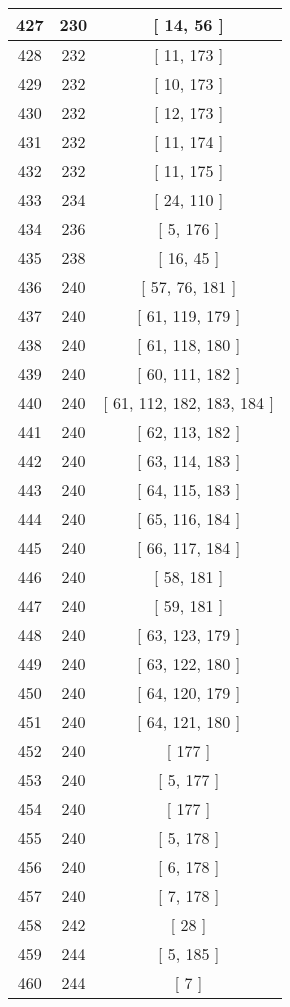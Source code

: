 \begin{center}
\begin{longtable}[H]{|| c c c ||}
\hline
427 & 230 & [ 14, 56 ] \\ 
\hline
428 & 232 & [ 11, 173 ] \\ 
\hline
429 & 232 & [ 10, 173 ] \\ 
\hline
430 & 232 & [ 12, 173 ] \\ 
\hline
431 & 232 & [ 11, 174 ] \\ 
\hline
432 & 232 & [ 11, 175 ] \\ 
\hline
433 & 234 & [ 24, 110 ] \\ 
\hline
434 & 236 & [ 5, 176 ] \\ 
\hline
435 & 238 & [ 16, 45 ] \\ 
\hline
436 & 240 & [ 57, 76, 181 ] \\ 
\hline
437 & 240 & [ 61, 119, 179 ] \\ 
\hline
438 & 240 & [ 61, 118, 180 ] \\ 
\hline
439 & 240 & [ 60, 111, 182 ] \\ 
\hline
440 & 240 & [ 61, 112, 182, 183, 184 ] \\ 
\hline
441 & 240 & [ 62, 113, 182 ] \\ 
\hline
442 & 240 & [ 63, 114, 183 ] \\ 
\hline
443 & 240 & [ 64, 115, 183 ] \\ 
\hline
444 & 240 & [ 65, 116, 184 ] \\ 
\hline
445 & 240 & [ 66, 117, 184 ] \\ 
\hline
446 & 240 & [ 58, 181 ] \\ 
\hline
447 & 240 & [ 59, 181 ] \\ 
\hline
448 & 240 & [ 63, 123, 179 ] \\ 
\hline
449 & 240 & [ 63, 122, 180 ] \\ 
\hline
450 & 240 & [ 64, 120, 179 ] \\ 
\hline
451 & 240 & [ 64, 121, 180 ] \\ 
\hline
452 & 240 & [ 177 ] \\ 
\hline
453 & 240 & [ 5, 177 ] \\ 
\hline
454 & 240 & [ 177 ] \\ 
\hline
455 & 240 & [ 5, 178 ] \\ 
\hline
456 & 240 & [ 6, 178 ] \\ 
\hline
457 & 240 & [ 7, 178 ] \\ 
\hline
458 & 242 & [ 28 ] \\ 
\hline
459 & 244 & [ 5, 185 ] \\ 
\hline
460 & 244 & [ 7 ] \\ 

\end{longtable}
\end{center}
